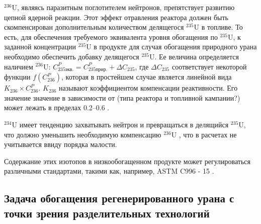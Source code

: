 $^{236}$U, являясь паразитным поглотителем нейтронов, препятствует развитию цепной ядерной реакции.
Этот эффект отравления реактора должен быть скомпенсирован дополнительным количеством делящегося $^{235}$U в топливе.
То есть, для обеспечения требуемого эквивалента уровня обогащения по $^{235}$U, к заданной концентрации $^{235}$U в продукте для случая обогащения природного урана необходимо обеспечить добавку делящегося $^{235}$U.
Ее величина определяется наличием $^{236}$U:
$C_{235 экв.}^{P}=C_{235 прир.}^{P}+\Delta C_{235}$, где $\Delta C_{235}$ соответствует некоторой функции $f\left(C_{236}^{P}\right)$, которая в простейшем случае является линейной вида $K_{236} \times C_{236}^{P}$. $K_{236}$ называют коэффициентом компенсации реактивности. Его значение значение в зависимости от (типа реактора и топливной кампании?) может лежать в пределах 0.2--0.6 \cite{delagarzaMulticomponentIsotopeSeparation1961, delculAnalysisReuseUranium2009}. 

$^{234}$U имеет тенденцию захватывать нейтрон и превращаться в делящийся $^{235}$U, что должно уменьшить необходимую компенсацию $^{236}$U \cite{dyachenkoIspolzovanieRegenerirovannogoUrana2012}, что в расчетах не учитывается ввиду порядка малости.

Содержание этих изотопов в низкообогащенном продукте может регулироваться различными стандартами, такими как, например, ASTM C996 - 15 \cite{c26committeeSpecificationUraniumHexafluoride}.

\subsection{Задача обогащения регенерированного урана с точки зрения разделительных технологий}

